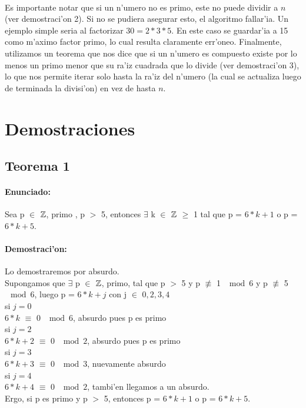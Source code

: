 \paragraph{}
Es importante notar que si un n'umero no es primo, este no puede dividir a $n$ (ver demostraci'on 2). Si 
no se pudiera asegurar esto, el algoritmo fallar'ia. Un ejemplo simple seria al factorizar $30 = 2*3*5$. 
En este caso se guardar'ia a 15 como m'aximo factor primo, lo cual resulta claramente err'oneo. Finalmente, 
utilizamos un teorema que nos dice que si un n'umero es compuesto existe por lo menos un primo menor que su 
ra'iz cuadrada que lo divide (ver demostraci'on 3), lo que nos permite iterar solo hasta la ra'iz del n'umero 
(la cual se actualiza luego de terminada la divisi'on) en vez de hasta $n$.

\section{Demostraciones}
\subsection{Teorema 1}
\paragraph{Enunciado:}
Sea p $\in$ ${\mathbb Z}$, primo , p $>$ 5, entonces $\exists$ k $\in$ ${\mathbb Z}$ $\geq$ 1  tal que p = $6*k+1$ o p = $6*k +5$.
\paragraph{Demostraci'on:}
Lo demostraremos por absurdo.\\ 
Supongamos que $\exists$ p $\in$ ${\mathbb Z}$, primo, tal que p $>$ 5 y p $\not\equiv$ 1  $\mod{6}$ y p
$\not\equiv$ 5  $\mod{6}$, luego p = $6*k + j$ con j $\in$ ${0,2,3,4}$ \\
si $j = 0$\\
$6*k$ $\equiv$ 0  $\mod{6}$, absurdo pues p es primo\\
si $j = 2$\\
$6*k + 2$ $\equiv$ 0  $\mod{2}$, absurdo pues p es primo \\
si $j = 3$\\
$6*k + 3$ $\equiv$ 0  $\mod{3}$, nuevamente absurdo\\
si $j = 4$\\
$6*k + 4$ $\equiv$ 0  $\mod{2}$, tambi'en llegamos a un absurdo.\\
Ergo, si p es primo y p $>$ 5, entonces p = $6*k+1$ o p = $6*k +5$.

